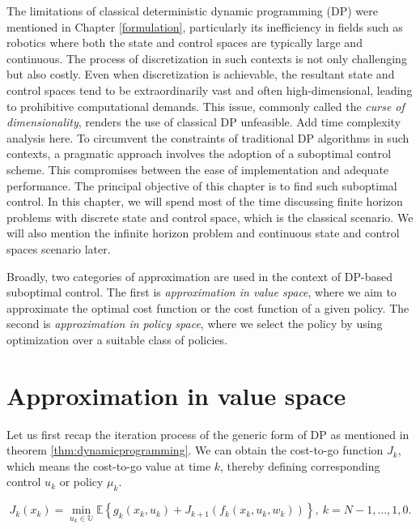 \documentclass[
]{book}
\theoremstyle{definition}
\theoremstyle{definition}
\theoremstyle{definition}
\theoremstyle{definition}
\theoremstyle{remark}
\begin{document}
The limitations of classical deterministic dynamic programming (DP) were mentioned in Chapter \ref{formulation}, particularly its inefficiency in fields such as robotics where both the state and control spaces are typically large and continuous. The process of discretization in such contexts is not only challenging but also costly. Even when discretization is achievable, the resultant state and control spaces tend to be extraordinarily vast and often high-dimensional, leading to prohibitive computational demands. This issue, commonly called the \emph{curse of dimensionality}, renders the use of classical DP unfeasible. {Add time complexity analysis here}.
To circumvent the constraints of traditional DP algorithms in such contexts, a pragmatic approach involves the adoption of a suboptimal control scheme. This compromises between the ease of implementation and adequate performance. The principal objective of this chapter is to find such suboptimal control. In this chapter, we will spend most of the time discussing finite horizon problems with discrete state and control space, which is the classical scenario. We will also mention the infinite horizon problem and continuous state and control spaces scenario later.

Broadly, two categories of approximation are used in the context of DP-based suboptimal control. The first is \emph{approximation in value space}, where we aim to approximate the optimal cost function or the cost function of a given policy. The second is \emph{approximation in policy space}, where we select the policy by using optimization over a suitable class of policies.

\hypertarget{approximation-in-value-space}{%
\section{Approximation in value space}\label{approximation-in-value-space}}

Let us first recap the iteration process of the generic form of DP as mentioned in theorem \ref{thm:dynamicprogramming}. We can obtain the cost-to-go function \(J_k\), which means the cost-to-go value at time \(k\), thereby defining corresponding control \(u_k\) or policy \(\mu_k\).

\begin{equation}
J_k(x_k) = \min_{u_k \in \mathbb{U}} \displaystyle \mathbb{E} \displaystyle \left\{ g_k(x_k,u_k) + J_{k+1}(f_k(x_k,u_k,w_k) ) \right\}, \ k=N-1,\dots,1,0.
\end{equation}
\end{document}
